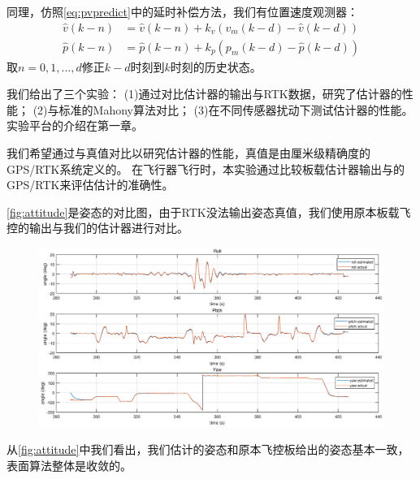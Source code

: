 \documentclass[
  type=master
]{gdutthesis}
\begin{document}
同理，仿照\autoref{eq:pvpredict}中的延时补偿方法，我们有位置速度观测器：
\begin{equation}\label{eq:mypvcorrection}
	\begin{aligned}
		\hat{v}(k-n) &= \hat{v}(k-n) + k_v (v_m(k-d) - \hat{v}(k-d))\\
		\hat{p}(k-n) &= \hat{p}(k-n) + k_p (p_m(k-d) - \hat{p}(k-d))
	\end{aligned}
\end{equation}
取$n=0,1,...,d$修正$k-d$时刻到$k$时刻的历史状态。

我们给出了三个实验：
(1)通过对比估计器的输出与RTK数据，研究了估计器的性能；
(2)与标准的Mahony算法对比；
(3)在不同传感器扰动下测试估计器的性能。
实验平台的介绍在第一章。

我们希望通过与真值对比以研究估计器的性能，真值是由厘米级精确度的GPS/RTK系统定义的。
在飞行器飞行时，本实验通过比较板载估计器输出与的GPS/RTK来评估估计的准确性。

\autoref{fig:attitude}是姿态的对比图，由于RTK没法输出姿态真值，我们使用原本板载飞控的输出与我们的估计器进行对比。
\begin{figure}[htbp]
	\centering
	\includegraphics[width=1.0\textwidth]{attitude1.eps}
	\label{fig:attitude}
\end{figure} 
从\autoref{fig:attitude}中我们看出，我们估计的姿态和原本飞控板给出的姿态基本一致，表面算法整体是收敛的。
\end{document}
